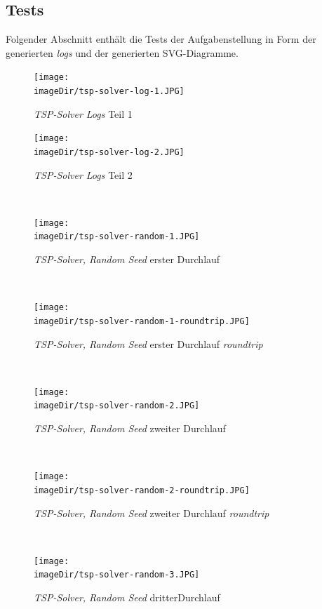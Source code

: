 \documentclass[11pt, a4paper, twoside]{article}   	%
\newcommand{\imageDir}{images}
\begin{document}
\subsection{Tests}
Folgender Abschnitt enthält die Tests der Aufgabenstellung in Form der generierten \emph{logs} und der generierten SVG-Diagramme.
\begin{figure}[h]
	\centering
	\texttt{[image: \\imageDir/tsp-solver-log-1.JPG]}
	\caption{\emph{TSP-Solver Logs} Teil 1}
\end{figure}

\begin{figure}[h]
	\centering
	\texttt{[image: \\imageDir/tsp-solver-log-2.JPG]}
	\caption{\emph{TSP-Solver Logs} Teil 2}
\end{figure}
\ \newpage

\begin{figure}[h]
	\centering
	\texttt{[image: \\imageDir/tsp-solver-random-1.JPG]}
	\caption{\emph{TSP-Solver, Random Seed} erster Durchlauf}
\end{figure}
\ \newpage

\begin{figure}[h]
	\centering
	\texttt{[image: \\imageDir/tsp-solver-random-1-roundtrip.JPG]}
	\caption{\emph{TSP-Solver, Random Seed} erster Durchlauf \emph{roundtrip}}
\end{figure}
\ \newpage

\begin{figure}[h]
	\centering
	\texttt{[image: \\imageDir/tsp-solver-random-2.JPG]}
	\caption{\emph{TSP-Solver, Random Seed} zweiter Durchlauf}
\end{figure}
\ \newpage

\begin{figure}[h]
	\centering
	\texttt{[image: \\imageDir/tsp-solver-random-2-roundtrip.JPG]}
	\caption{\emph{TSP-Solver, Random Seed} zweiter Durchlauf \emph{roundtrip}}
\end{figure}
\ \newpage

\begin{figure}[h]
	\centering
	\texttt{[image: \\imageDir/tsp-solver-random-3.JPG]}
	\caption{\emph{TSP-Solver, Random Seed} dritterDurchlauf}
\end{figure}
\ \newpage
\end{document}
